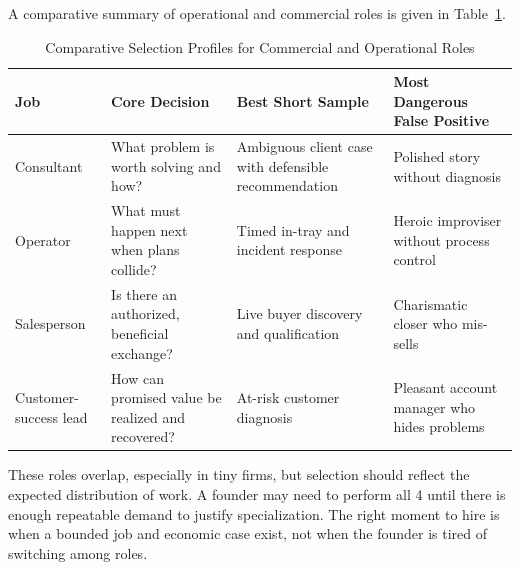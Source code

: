 A comparative summary of operational and commercial roles is given in Table~\ref{tab:commercial_role_comparison}.

\begin{table}[t]
\centering
\small
\caption{Comparative Selection Profiles for Commercial and Operational Roles}
\label{tab:commercial_role_comparison}
\begin{tabularx}{\textwidth}{p{2.5cm} p{4.2cm} p{4.5cm} X}
\toprule
\textbf{Job} & \textbf{Core Decision} & \textbf{Best Short Sample} & \textbf{Most Dangerous False Positive} \\
\midrule
Consultant & What problem is worth solving and how? & Ambiguous client case with defensible recommendation & Polished story without diagnosis \\
Operator & What must happen next when plans collide? & Timed in-tray and incident response & Heroic improviser without process control \\
Salesperson & Is there an authorized, beneficial exchange? & Live buyer discovery and qualification & Charismatic closer who mis-sells \\
Customer-success lead & How can promised value be realized and recovered? & At-risk customer diagnosis & Pleasant account manager who hides problems \\
\bottomrule
\end{tabularx}
\end{table}

These roles overlap, especially in tiny firms, but selection should reflect the expected distribution of work. A founder may need to perform all 4 until there is enough repeatable demand to justify specialization. The right moment to hire is when a bounded job and economic case exist, not when the founder is tired of switching among roles.
